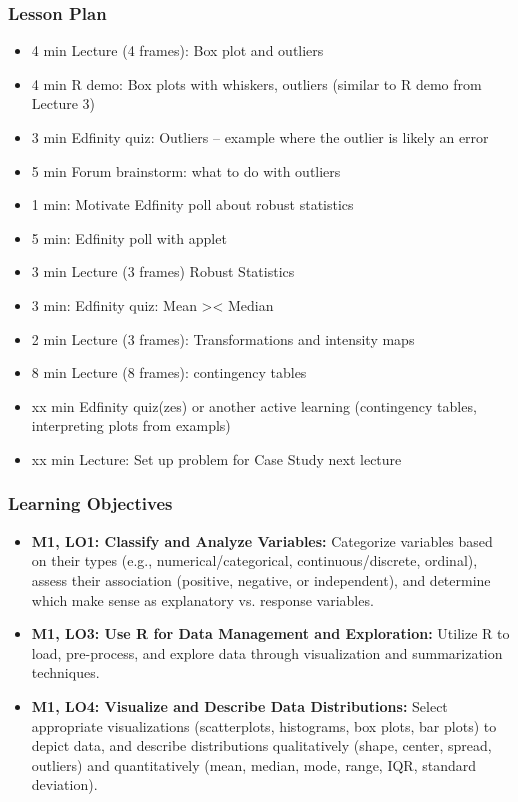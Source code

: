 \begin{frame}
    \frametitle{Lesson Plan}
    \begin{itemize}
        \item 4 min Lecture (4 frames): Box plot and outliers
        \item 4 min R demo: Box plots with whiskers, outliers (similar to R demo from Lecture 3)
        \item 3 min Edfinity quiz: Outliers -- example where the outlier is likely an error
        \item 5 min Forum brainstorm: what to do with outliers
        \item 1 min: Motivate Edfinity poll about robust statistics
        \item 5 min: Edfinity poll with applet
        \item 3 min Lecture (3 frames) Robust Statistics 
        \item 3 min: Edfinity quiz: Mean >< Median
        \item 2 min Lecture (3 frames): Transformations and intensity maps
        \item 8 min Lecture (8 frames): contingency tables
        \item xx min Edfinity quiz(zes) or another active learning (contingency tables, interpreting plots from exampls)
        \item xx min Lecture: Set up problem for Case Study next lecture
    \end{itemize}
\end{frame}

\begin{frame}
    \frametitle{Learning Objectives}
    \begin{itemize}
        \item \textbf{M1, LO1: Classify and Analyze Variables:} Categorize variables based on their types (e.g., numerical/categorical, continuous/discrete, ordinal), assess their association (positive, negative, or independent), and determine which make sense as explanatory vs. response variables.
        \item \textbf{M1, LO3: Use R for Data Management and Exploration:} Utilize R to load, pre-process, and explore data through visualization and summarization techniques.
        \item \textbf{M1, LO4: Visualize and Describe Data Distributions:} Select appropriate visualizations (scatterplots, histograms, box plots, bar plots) to depict data, and describe distributions qualitatively (shape, center, spread, outliers) and quantitatively (mean, median, mode, range, IQR, standard deviation).
    \end{itemize}
\end{frame}

